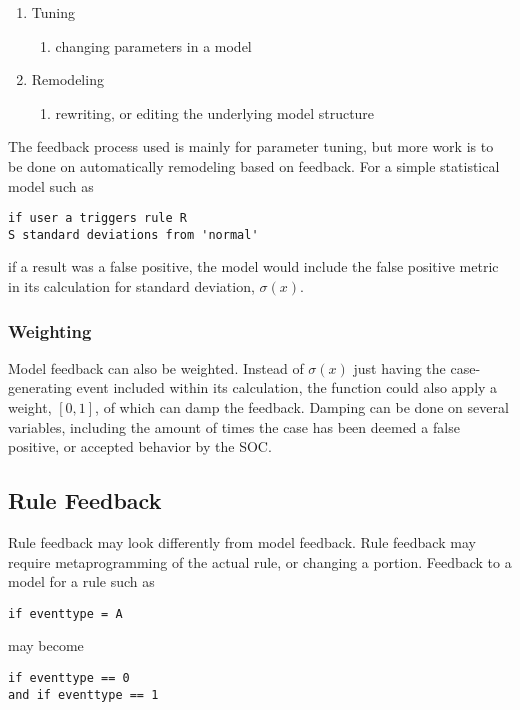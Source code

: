 \documentclass[10pt, titlepage, twocolumn]{article}
\begin{document}
\begin{enumerate}
\item Tuning
	\begin{enumerate}
	\item changing parameters in a model
	\end{enumerate}
\item Remodeling
	\begin{enumerate}
	\item rewriting, or editing the underlying model structure
	\end{enumerate}
\end{enumerate}


The feedback process used is mainly for parameter tuning, but more work is to be done on automatically remodeling based on feedback. For a simple statistical model such as

\begin{verbatim}
if user a triggers rule R
S standard deviations from 'normal'
\end{verbatim}

if a result was a false positive, the model would include the false positive metric in its calculation for standard deviation, \(\sigma(x)\).

\subsubsection{Weighting}
Model feedback can also be weighted. Instead of \(\sigma(x)\) just having the case-generating event included within its calculation, the function could also apply a weight, \([0,1]\), of which can damp the feedback. Damping can be done on several variables, including the amount of times the case has been deemed a false positive, or accepted behavior by the SOC.



\subsection{Rule Feedback}
Rule feedback may look differently from model feedback. Rule feedback may require metaprogramming of the actual rule, or changing a portion. Feedback to a model for a rule such as

\begin{verbatim}
if eventtype = A
\end{verbatim}

may become

\begin{verbatim}
if eventtype == 0 
and if eventtype == 1
\end{verbatim}
\end{document}
